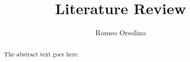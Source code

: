 \documentclass{article}
\begin{document}
\title{Literature Review}
\author{Romeo Orsolino}

\maketitle
\tableofcontents
\begin{abstract}
The abstract text goes here.
\end{abstract}















\end{document}
